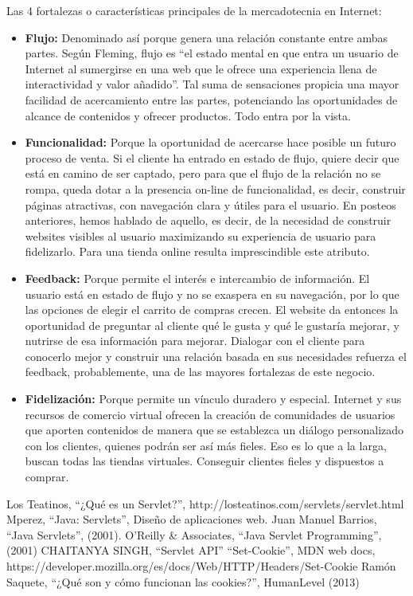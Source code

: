 \documentclass[a4paper,12pt]{article}
\begin{document}
\begin{enumerate}
 Las 4 fortalezas o características principales de la mercadotecnia en Internet:
 
 \begin{itemize}
  \item \textbf{Flujo:} Denominado así porque genera una relación constante entre ambas partes. Según Fleming, flujo es “el estado mental en que entra un usuario de Internet
  al sumergirse en una web que le ofrece una experiencia llena de interactividad y valor añadido”. Tal suma de sensaciones propicia una mayor facilidad de acercamiento 
  entre las partes, potenciando las oportunidades de alcance de contenidos y ofrecer productos. Todo entra por la vista.
  \item \textbf{Funcionalidad:} Porque la oportunidad de acercarse hace posible un futuro proceso de venta. Si el cliente ha entrado en estado de flujo, quiere decir
  que está en camino de ser captado, pero para que el flujo de la relación no se rompa, queda dotar a la presencia on-line de funcionalidad, es decir, construir
  páginas atractivas, con navegación clara y útiles para el usuario. En posteos anteriores, hemos hablado de aquello, es decir, de la necesidad de construir websites
  visibles al usuario maximizando su experiencia de usuario para fidelizarlo. Para una tienda online resulta imprescindible este atributo.
  \item \textbf{Feedback:} Porque permite el interés e intercambio de información. El usuario está en estado de flujo y no se exaspera en su navegación, por lo que 
  las opciones de elegir el carrito de compras crecen. El website da entonces la oportunidad de preguntar al cliente qué le gusta y qué le gustaría mejorar, y 
  nutrirse de esa información para mejorar. Dialogar con el cliente para conocerlo mejor y construir una relación basada en sus necesidades refuerza el feedback, 
  probablemente, una de las mayores fortalezas de este negocio.
  \item \textbf{Fidelización:} Porque permite un vínculo duradero y especial. Internet y sus recursos de comercio virtual ofrecen la creación de comunidades de usuarios
  que aporten contenidos de manera que se establezca un diálogo personalizado con los clientes, quienes podrán ser así más fieles. Eso es lo que a la larga, buscan
  todas las tiendas virtuales. Conseguir clientes fieles y dispuestos a comprar.
 \end{itemize}

 
\end{enumerate}

\begin{thebibliography}{1}
 Los Teatinos, ``¿Qué es un Servlet?'', http://losteatinos.com/servlets/servlet.html
 Mperez, ``Java: Servlets'', Diseño de aplicaciones web.
 Juan Manuel Barrios, ``Java Servlets'', (2001).
 O'Reilly \& Associates, ``Java Servlet Programming'', (2001)
 CHAITANYA SINGH, ``Servlet API''
 ``Set-Cookie'', MDN web docs, https://developer.mozilla.org/es/docs/Web/HTTP/Headers/Set-Cookie
 Ramón Saquete, ``¿Qué son y cómo funcionan las cookies?'', HumanLevel (2013)
\end{thebibliography}
 

 
\end{document}
